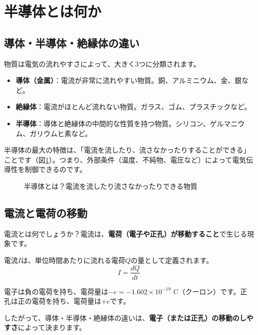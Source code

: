 \section{半導体とは何か}

\subsection{導体・半導体・絶縁体の違い}

物質は電気の流れやすさによって、大きく3つに分類されます。

\begin{itemize}
\item \textbf{導体（金属）}：電流が非常に流れやすい物質。銅、アルミニウム、金、銀など。
\item \textbf{絶縁体}：電流がほとんど流れない物質。ガラス、ゴム、プラスチックなど。
\item \textbf{半導体}：導体と絶縁体の中間的な性質を持つ物質。シリコン、ゲルマニウム、ガリウムヒ素など。
\end{itemize}

半導体の最大の特徴は、「電流を流したり、流さなかったりすることができる」ことです（図\ref{fig:what_is_semiconductor}）。つまり、外部条件（温度、不純物、電圧など）によって電気伝導性を制御できるのです。

\begin{figure}[H]
\centering
{}
\caption{半導体とは？電流を流したり流さなかったりできる物質}
\label{fig:what_is_semiconductor}
\end{figure}

\subsection{電流と電荷の移動}

電流とは何でしょうか？電流は、\textbf{電荷（電子や正孔）が移動すること}で生じる現象です。

電流$I$は、単位時間あたりに流れる電荷$Q$の量として定義されます。
\begin{equation}
I = \frac{dQ}{dt}
\end{equation}

電子は負の電荷を持ち、電荷量は$-e = -1.602 \times 10^{-19}$ C（クーロン）です。正孔は正の電荷を持ち、電荷量は$+e$です。

したがって、導体・半導体・絶縁体の違いは、\textbf{電子（または正孔）の移動のしやすさ}によって決まります。

